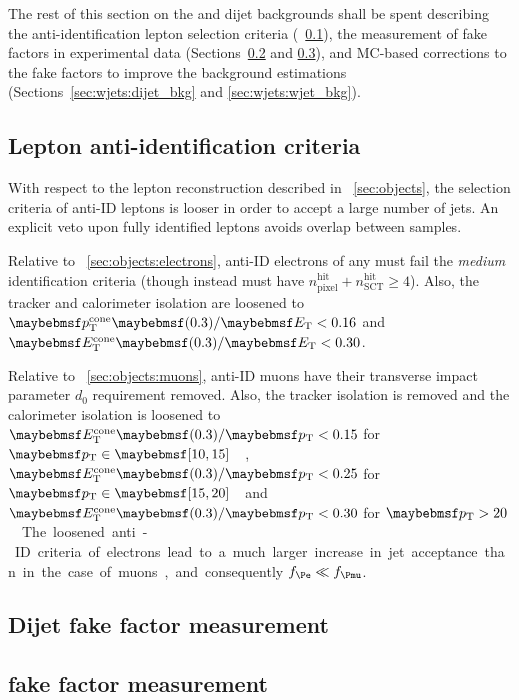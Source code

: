 The rest of this section on the \Wjets and dijet backgrounds shall be spent describing 
the anti-identification lepton selection criteria (\Section~\ref{sec:wjets:antiid}), the 
measurement of fake factors in experimental data (Sections~\ref{sec:wjets:dijet_ff} and 
\ref{sec:wjets:zjet_ff}), and MC-based corrections to the fake factors to improve the 
background estimations (Sections~\ref{sec:wjets:dijet_bkg} and \ref{sec:wjets:wjet_bkg}).



\subsection{Lepton anti-identification criteria}
\label{sec:wjets:antiid}

With respect to the lepton reconstruction described in \Section~\ref{sec:objects}, the 
selection criteria of anti-ID leptons is looser in order to accept a large number of 
jets. An explicit veto upon fully identified leptons avoids overlap between samples.

Relative to \Section~\ref{sec:objects:electrons}, anti-ID electrons of any \pt must fail 
the \textit{medium} identification criteria (though instead must have 
$n_{\text{pixel}}^{\text{hit}} + n_{\text{SCT}}^{\text{hit}} \geq 4$). Also, the tracker 
and calorimeter isolation are loosened to $\ptcone{0.3}/\et < 0.16$ and 
$\etcone{0.3}/\et < 0.30$.

Relative to \Section~\ref{sec:objects:muons}, anti-ID muons have their transverse impact 
parameter $d_0$ requirement removed. Also, the tracker isolation is removed and the 
calorimeter isolation is loosened to $\etcone{0.3}/\pt < 0.15$ for 
\unit{$\pt \in \hardrange{10,15}$}{\GeV}, $\etcone{0.3}/\pt < 0.25$ for 
\unit{$\pt \in \hardrange{15,20}$}{\GeV} and $\etcone{0.3}/\pt < 0.30$ for 
\unit{$\pt > 20$}{\GeV}.

The loosened anti-ID criteria of electrons lead to a much larger increase in jet 
acceptance than in the case of muons, and consequently $f_{\Pe} \ll f_{\Pmu}$.



\subsection{Dijet fake factor measurement}
\label{sec:wjets:dijet_ff}




\subsection{\Zjets fake factor measurement}
\label{sec:wjets:zjet_ff}




